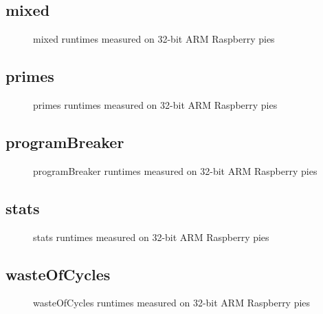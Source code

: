 \newpage
\subsection{mixed}
    
    \begin{figure}[h]
	    \centering
		
        \caption{mixed runtimes measured on 32-bit ARM Raspberry pies}
	\end{figure}
    


\newpage
\subsection{primes}
    
    \begin{figure}[h]
	    \centering
		
        \caption{primes runtimes measured on 32-bit ARM Raspberry pies}
	\end{figure}
    


\newpage
\subsection{programBreaker}
    
    \begin{figure}[h]
	    \centering
		
        \caption{programBreaker runtimes measured on 32-bit ARM Raspberry pies}
	\end{figure}
    


\newpage
\subsection{stats}
    
    \begin{figure}[h]
	    \centering
		
        \caption{stats runtimes measured on 32-bit ARM Raspberry pies}
	\end{figure}
    


\newpage
\subsection{wasteOfCycles}
    
    \begin{figure}[h]
	    \centering
		
        \caption{wasteOfCycles runtimes measured on 32-bit ARM Raspberry pies}
	\end{figure}
    

